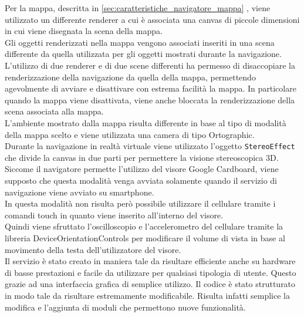 Per la mappa, descritta in \ref{sec:caratteristiche_navigatore_mappa} , viene utilizzato un differente renderer a cui è associata una canvas di piccole dimensioni in cui viene disegnata la scena della mappa.
\\
Gli oggetti renderizzati nella mappa vengono associati inseriti in una scena differente da quella utilizzata per gli oggetti mostrati durante la navigazione.
\\
L’utilizzo di due renderer e di due scene differenti ha permesso di disaccopiare la renderizzazione della navigazione da quella della mappa, permettendo agevolmente di avviare e disattivare con estrema facilità la mappa. In particolare quando la mappa viene disattivata, viene anche bloccata la renderizzazione della scena associata alla mappa.
\\
L’ambiente mostrato dalla mappa risulta differente in base al tipo di modalità della mappa scelto e viene utilizzata una camera di tipo Ortographic.
\\
Durante la navigazione in realtà virtuale viene utilizzato l’oggetto \texttt{StereoEffect} che divide la canvas in due parti per permettere la visione stereoscopica 3D.
Siccome il navigatore permette l’utilizzo del visore Google Cardboard, viene supposto che questa modalità venga avviata solamente quando il servizio di navigazione viene avviato su smartphone.
\\
In questa modalità non risulta però possibile utilizzare il cellulare tramite i comandi touch in quanto viene inserito all’interno del visore.
\\
Quindi viene sfruttato l’oscilloscopio e l’accelerometro del cellulare tramite la libreria DeviceOrientationControls per modificare il volume di vista in base al movimento della testa dell’utilizzatore del visore.
\\

Il servizio è stato creato in maniera tale da risultare efficiente anche su hardware di basse prestazioni e facile da utilizzare per qualsiasi tipologia di utente. Questo grazie ad una interfaccia grafica di semplice utilizzo.
Il codice è stato strutturato in modo tale da risultare estremamente modificabile. Risulta infatti semplice la modifica e l’aggiunta di moduli che permettono nuove funzionalità.

